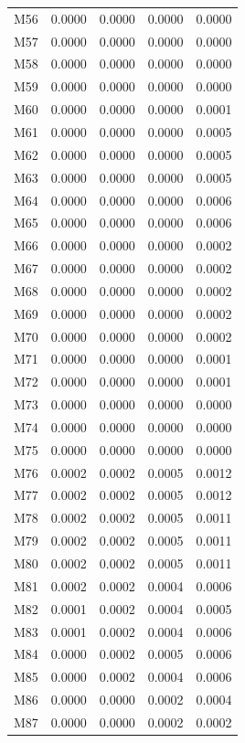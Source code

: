 \begin{longtable}{lrrrr}
M56 & 0.0000 & 0.0000 & 0.0000 & 0.0000 \\
M57 & 0.0000 & 0.0000 & 0.0000 & 0.0000 \\
M58 & 0.0000 & 0.0000 & 0.0000 & 0.0000 \\
M59 & 0.0000 & 0.0000 & 0.0000 & 0.0000 \\
M60 & 0.0000 & 0.0000 & 0.0000 & 0.0001 \\
M61 & 0.0000 & 0.0000 & 0.0000 & 0.0005 \\
M62 & 0.0000 & 0.0000 & 0.0000 & 0.0005 \\
M63 & 0.0000 & 0.0000 & 0.0000 & 0.0005 \\
M64 & 0.0000 & 0.0000 & 0.0000 & 0.0006 \\
M65 & 0.0000 & 0.0000 & 0.0000 & 0.0006 \\
M66 & 0.0000 & 0.0000 & 0.0000 & 0.0002 \\
M67 & 0.0000 & 0.0000 & 0.0000 & 0.0002 \\
M68 & 0.0000 & 0.0000 & 0.0000 & 0.0002 \\
M69 & 0.0000 & 0.0000 & 0.0000 & 0.0002 \\
M70 & 0.0000 & 0.0000 & 0.0000 & 0.0002 \\
M71 & 0.0000 & 0.0000 & 0.0000 & 0.0001 \\
M72 & 0.0000 & 0.0000 & 0.0000 & 0.0001 \\
M73 & 0.0000 & 0.0000 & 0.0000 & 0.0000 \\
M74 & 0.0000 & 0.0000 & 0.0000 & 0.0000 \\
M75 & 0.0000 & 0.0000 & 0.0000 & 0.0000 \\
M76 & 0.0002 & 0.0002 & 0.0005 & 0.0012 \\
M77 & 0.0002 & 0.0002 & 0.0005 & 0.0012 \\
M78 & 0.0002 & 0.0002 & 0.0005 & 0.0011 \\
M79 & 0.0002 & 0.0002 & 0.0005 & 0.0011 \\
M80 & 0.0002 & 0.0002 & 0.0005 & 0.0011 \\
M81 & 0.0002 & 0.0002 & 0.0004 & 0.0006 \\
M82 & 0.0001 & 0.0002 & 0.0004 & 0.0005 \\
M83 & 0.0001 & 0.0002 & 0.0004 & 0.0006 \\
M84 & 0.0000 & 0.0002 & 0.0005 & 0.0006 \\
M85 & 0.0000 & 0.0002 & 0.0004 & 0.0006 \\
M86 & 0.0000 & 0.0000 & 0.0002 & 0.0004 \\
M87 & 0.0000 & 0.0000 & 0.0002 & 0.0002 \\

\end{longtable}
